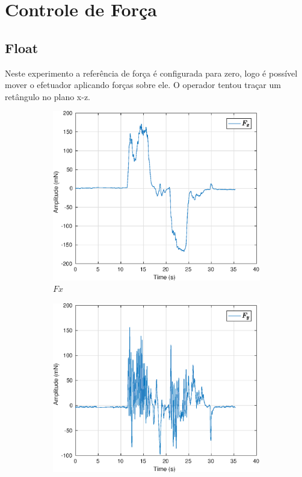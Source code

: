 \section{Controle de Força}

\subsection{Float}
Neste experimento a referência de força é configurada para zero, logo é possível mover o efetuador aplicando forças sobre ele. O operador tentou traçar um retângulo no plano x-z.

\begin{figure}[H]
\centering
\begin{subfigure}{.5\textwidth}
  \centering
  \includegraphics[width=\linewidth]{./img/float/Fx.eps}
  \caption{$Fx$}
  \label{fig:sub1}
\end{subfigure}%
\begin{subfigure}{.5\textwidth}
  \centering
  \includegraphics[width=\linewidth]{./img/float/Fy.eps}

\end{subfigure}
\end{figure}
